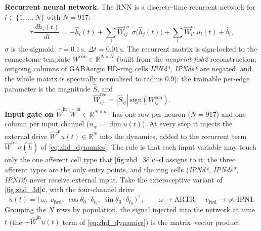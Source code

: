 \documentclass[11pt]{article}
\def\R{\mathbb{R}}
\begin{document}
\textbf{Recurrent neural network.}\label{method:RNN}
The RNN is a discrete-time recurrent network for
$i\in\{1,\dots,N\}$ with $N=917$:
\begin{equation}
\tau\,\frac{d\hat h_i(t)}{dt}
  = -\hat h_i(t)
  + \sum_j \hat W^{\mathrm{rec}}_{ij}\,\sigma\!\big(\hat h_j(t)\big)
  + \sum_l \hat W^{\mathrm{in}}_{il}\,u_l(t)
  + \hat b_i,
\label{eq:zhd_dynamics}
\end{equation}
$\sigma$ is the sigmoid, $\tau=0.1\,\mathrm{s}$, $\Delta t=0.01\,\mathrm{s}$.
The recurrent matrix is sign-locked to the connectome template
$W^{\mathrm{con}}\in\R^{N\times N}$ (built from the
\emph{neuprint-fish2} reconstruction; outgoing columns of GABAergic
HD-ring cells \emph{IPNd*}, \emph{IPNds*} are negated, and the whole
matrix is spectrally normalised to radius $0.9$): the trainable
per-edge parameter is the magnitude $\hat S$, and
\begin{equation}
\hat W^{\mathrm{rec}}_{ij}
  = |\hat S_{ij}|\,\mathrm{sign}(W^{\mathrm{con}}_{ij}).
\label{eq:zhd_w_rec}
\end{equation}
\bigskip
\noindent\textbf{Input gate on $\hat W^{\mathrm{in}}$}%
\label{method:input_extended}
$\hat W^{\mathrm{in}}\in\R^{N\times n_{\mathrm{in}}}$ has one row per
neuron ($N=917$) and one column per input channel
($n_{\mathrm{in}}=\dim u(t)$). At every step it injects the external
drive $\hat W^{\mathrm{in}}u(t)\in\R^{N}$ into the dynamics, added to
the recurrent term $\hat W^{\mathrm{rec}}\sigma(\hat h)$ of
\cref{eq:zhd_dynamics}. The rule is that each input variable may touch
only the one afferent cell type that
\cref{fig:zhd_3d}\textbf{c}--\textbf{d} assigns to it; the three
afferent types are the only entry points, and the ring cells
(\emph{IPNd*}, \emph{IPNds*}, \emph{IPN12}) never receive external
input. Take the exteroceptive variant of \cref{fig:zhd_3d}\textbf{c}, with the
four-channel drive
\begin{equation*}
u(t)=\bigl(\,\omega,\ v_{\mathrm{fwd}},\
   \cos\theta_0\!\cdot\!\delta_{t_0},\
   \sin\theta_0\!\cdot\!\delta_{t_0}\,\bigr)^{\!\top},\qquad
\omega\to\mathrm{ARTR},\quad v_{\mathrm{fwd}}\to\text{pt-IPN1}.
\end{equation*}
Grouping the $N$ rows by population, the signal injected into the
network at time $t$ (the $+\hat W^{\mathrm{in}}u(t)$ term of
\cref{eq:zhd_dynamics}) is the matrix--vector product
\end{document}
